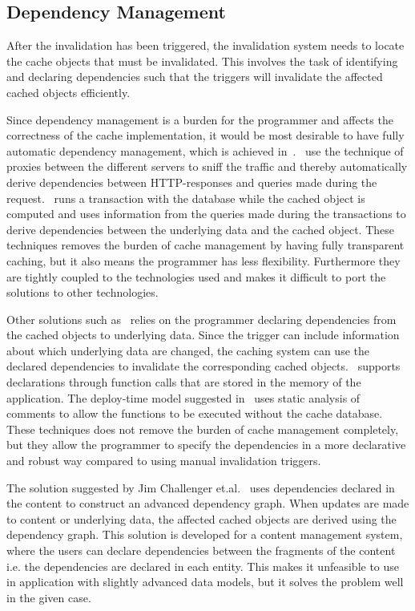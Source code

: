 
\subsection{Dependency Management}
\label{subsubsec:dependency-management}

After the invalidation has been triggered, the invalidation system needs to locate the cache objects that must be invalidated. This involves the task of identifying and declaring dependencies such that the triggers will invalidate the affected cached objects efficiently.

Since dependency management is a burden for the programmer and affects the correctness of the cache implementation, it would be most desirable to have fully automatic dependency management, which is achieved in~\cite{paper:liskov, paper:db-driven-http}.~\cite{paper:db-driven-http} use the technique of proxies between the different servers to sniff the traffic and thereby automatically derive dependencies between HTTP-responses and queries made during the request.~\cite{paper:liskov} runs a transaction with the database while the cached object is computed and uses information from the queries made during the transactions to derive dependencies between the underlying data and the cached object. These techniques removes the burden of cache management by having fully transparent caching, but it also means the programmer has less flexibility. Furthermore they are tightly coupled to the technologies used and makes it difficult to port the solutions to other technologies.

Other solutions such as~\cite{paper:cache-genie, paper:deploy-time} relies on the programmer declaring dependencies from the cached objects to underlying data. Since the trigger can include information about which underlying data are changed, the caching system can use the declared dependencies to invalidate the corresponding cached objects.~\cite{paper:cache-genie} supports declarations through function calls that are stored in the memory of the application. The deploy-time model suggested in~\cite{paper:deploy-time} uses static analysis of comments to allow the functions to be executed without the cache database. These techniques does not remove the burden of cache management completely, but they allow the programmer to specify the dependencies in a more declarative and robust way compared to using manual invalidation triggers.

The solution suggested by Jim Challenger et.al.~\cite{paper:ibm, paper:ibm-extended} uses dependencies declared in the content to construct an advanced dependency graph. When updates are made to content or underlying data, the affected cached objects are derived using the dependency graph. This solution is developed for a content management system, where the users can declare dependencies between the fragments of the content i.e. the dependencies are declared in each entity. This makes it unfeasible to use in application with slightly advanced data models, but it solves the problem well in the given case.

